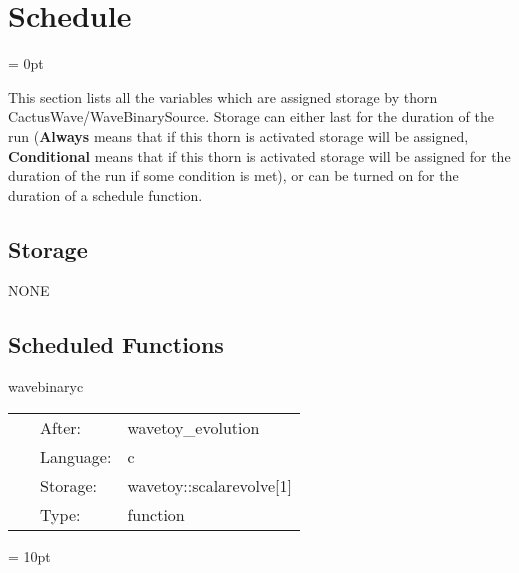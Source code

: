 
\section{Schedule} 


\parskip = 0pt


\noindent This section lists all the variables which are assigned storage by thorn CactusWave/WaveBinarySource.  Storage can either last for the duration of the run ({\bf Always} means that if this thorn is activated storage will be assigned, {\bf Conditional} means that if this thorn is activated storage will be assigned for the duration of the run if some condition is met), or can be turned on for the duration of a schedule function.


\subsection*{Storage}NONE
\subsection*{Scheduled Functions}
\vspace{5mm}


\hspace{5mm} wavebinaryc 

\hspace{5mm}{\it provide binary source during evolution (c) } 


\hspace{5mm}

 \begin{tabular*}{160mm}{cll} 
~ & After:  & wavetoy\_evolution \\ 
~ & Language:  & c \\ 
~ & Storage:  & wavetoy::scalarevolve[1] \\ 
~ & Type:  & function \\ 
\end{tabular*} 



\vspace{5mm}\parskip = 10pt 
